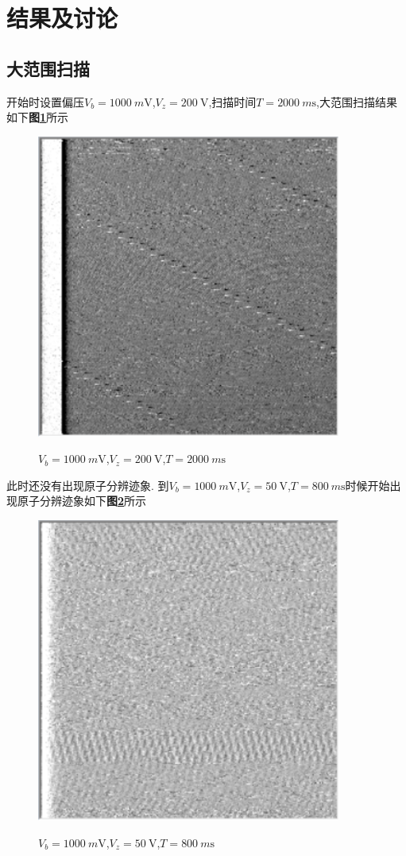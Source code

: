 \documentclass[a4paper]{article}
\begin{document}
\newpage
\section{结果及讨论}
\subsection{大范围扫描}\label{sub:1}
开始时设置偏压$V_b=\SI{1000}{m\volt}$,$V_z=\SI{200}{\volt}$,扫描时间$T=\SI{2000}{m\s}$,大范围扫描结果如下\textbf{图\ref{result:fig1}}所示 
\begin{figure}[H]
 \centering
 \caption{$V_b=\SI{1000}{m\volt}$,$V_z=\SI{200}{\volt}$,$T=\SI{2000}{m\s}$}
 \includegraphics[height=10cm, width=10cm]{images/200V-1000mV-2000ms.png}
 \label{result:fig1}
\end{figure}
此时还没有出现原子分辨迹象.
到$V_b=\SI{1000}{m\volt}$,$V_z=\SI{50}{\volt}$,$T=\SI{800}{m\s}$时候开始出现原子分辨迹象如下\textbf{图\ref{result:fig2}}所示
\begin{figure}[H]
 \centering
 \caption{$V_b=\SI{1000}{m\volt}$,$V_z=\SI{50}{\volt}$,$T=\SI{800}{m\s}$}
 \includegraphics[height=10cm, width=10cm]{images/50V-1000mV-800ms.png}
 \label{result:fig2}
\end{figure}
\end{document}
